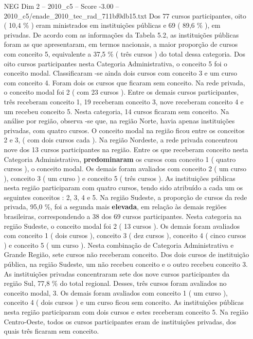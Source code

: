 \begin{textsample}{NEG Dim 2 – 2010\_c5 – Score -3.00 – 2010\_c5/enade\_2010\_tec\_rad\_711bf0db15.txt}
Dos 77 cursos participantes, oito ( 10,4 \% ) eram ministrados em instituições públicas e 69 ( 89,6 \% ), em privadas.
De acordo com as informações da Tabela 5.2, as instituições públicas foram as que apresentaram, em termos nacionais, a maior proporção de cursos com conceito 5, equivalente a 37,5 \% ( três cursos ) do total dessa categoria.
Dos oito cursos participantes nesta Categoria Administrativa, o conceito 5 foi o conceito modal.
Classificaram -se ainda dois cursos com conceito 3 e um curso com conceito 4.
Foram dois os cursos que ficaram sem conceito.
Na rede privada, o conceito modal foi 2 ( com 23 cursos ).
Entre os demais cursos participantes, três receberam conceito 1, 19 receberam conceito 3, nove receberam conceito 4 e um recebeu conceito 5.
Nesta categoria, 14 cursos ficaram sem conceito.
Na análise por região, observa -se que, na região Norte, havia apenas instituições privadas, com quatro cursos.
O conceito modal na região ficou entre os conceitos 2 e 3, ( com dois cursos cada ).
Na região Nordeste, a rede privada concentrou nove dos 13 cursos participantes na região.
Entre os que receberam conceito nesta Categoria Administrativa, \textbf{predominaram} os cursos com conceito 1 ( quatro cursos ), o conceito modal.
Os demais foram avaliados com conceito 2 ( um curso ), conceito 3 ( um curso ) e conceito 5 ( três cursos ).
As instituições públicas nesta região participaram com quatro cursos, tendo sido atribuído a cada um os seguintes conceitos : 2, 3, 4 e 5.
Na região Sudeste, a proporção de cursos da rede privada, 95,0 \%, foi a segunda mais \textbf{elevada}, em relação às demais regiões brasileiras, correspondendo a 38 dos 69 cursos participantes.
Nesta categoria na região Sudeste, o conceito modal foi 2 ( 13 cursos ).
Os demais foram avaliados com conceito 1 ( dois cursos ), conceito 3 ( dez cursos ), conceito 4 ( cinco cursos ) e conceito 5 ( um curso ).
Nesta combinação de Categoria Administrativa e Grande Região, sete cursos não receberam conceito.
Dos dois cursos de instituição pública, na região Sudeste, um não recebeu conceito e o outro recebeu conceito 3.
As instituições privadas concentraram sete dos nove cursos participantes da região Sul, 77,8 \% do total regional.
Desses, três cursos foram avaliados no conceito modal, 3.
Os demais foram avaliados com conceito 1 ( um curso ), conceito 4 ( dois cursos ) e um curso ficou sem conceito.
As instituições públicas nesta região participaram com dois cursos e estes receberam conceito 5.
Na região Centro-Oeste, todos os cursos participantes eram de instituições privadas, dos quais três ficaram sem conceito.

\end{textsample}
